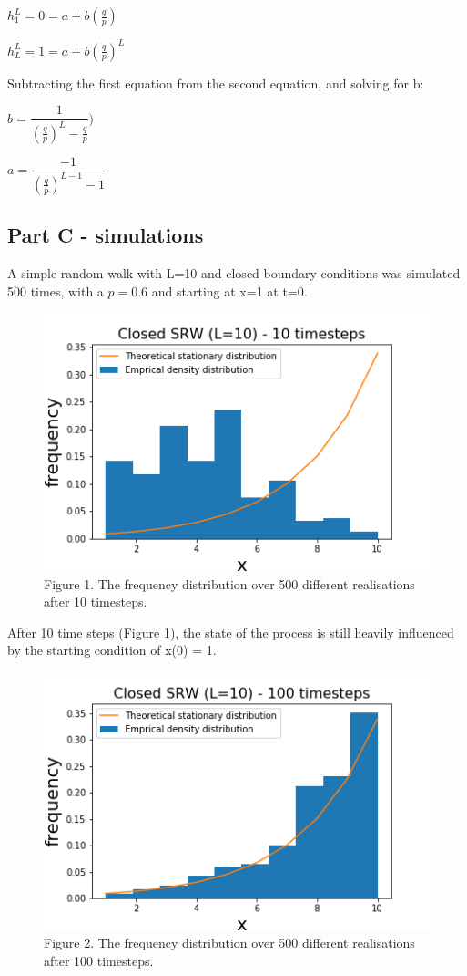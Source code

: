 \documentclass{article}
\begin{document}
$h_1^L = 0 = a + b(\frac{q}{p})$

$h_L^L = 1 = a + b(\frac{q}{p})^L$

Subtracting the first equation from the second equation, and solving for b:

$b = \dfrac{1}{(\frac{q}{p})^{L}-\frac{q}{p}})$

$a = \dfrac{-1}{(\frac{q}{p})^{L-1}-1}$


\subsection{Part C - simulations}

A simple random walk with L=10 and closed boundary conditions was simulated 500 times, with a $p=0.6$ and starting at x=1 at t=0.

\begin{figure}
\includegraphics[scale=0.5]{10_steps_a.png} 
\small{Figure 1. The frequency distribution over 500 different realisations after 10 timesteps.}
\end{figure}

After 10 time steps (Figure 1), the state of the process is still heavily influenced by the starting condition of x(0) = 1. 

\begin{figure}
\includegraphics[scale=0.5]{100_steps_a.png} 
\small{Figure 2. The frequency distribution over 500 different realisations after 100 timesteps.}
\end{figure}
\end{document}
